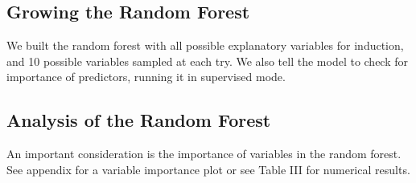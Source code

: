 \documentclass[letterpaper, 10 pt, conference]{ieeeconf}
\begin{document}
\subsection{Growing the Random Forest} 
We built the random forest with all possible explanatory variables for induction, and 10 possible variables sampled at each try. We also tell the model to check for importance of predictors, running it in supervised mode.

\subsection{Analysis of the Random Forest}
An important consideration is the importance of variables in the random forest. See appendix for a variable importance plot or see Table III for numerical results.
\end{document}
